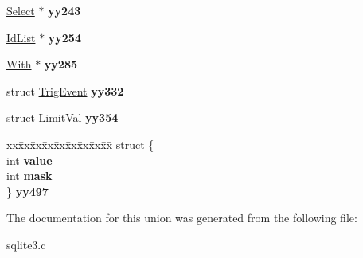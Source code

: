 \begin{DoxyCompactItemize}
\item 
\hyperlink{structSelect}{Select} $\ast$ {\bfseries yy243}\hypertarget{unionYYMINORTYPE_a80ed4018ab77efab9019fb79998c2fac}{}\label{unionYYMINORTYPE_a80ed4018ab77efab9019fb79998c2fac}

\item 
\hyperlink{structIdList}{Id\+List} $\ast$ {\bfseries yy254}\hypertarget{unionYYMINORTYPE_a2c5a8617af8d21140ef030b3432fc88a}{}\label{unionYYMINORTYPE_a2c5a8617af8d21140ef030b3432fc88a}

\item 
\hyperlink{structWith}{With} $\ast$ {\bfseries yy285}\hypertarget{unionYYMINORTYPE_a352681ca0ddf1e1eb6208f2277bbe70f}{}\label{unionYYMINORTYPE_a352681ca0ddf1e1eb6208f2277bbe70f}

\item 
struct \hyperlink{structTrigEvent}{Trig\+Event} {\bfseries yy332}\hypertarget{unionYYMINORTYPE_aed59879c2d3501a15586de9eba852459}{}\label{unionYYMINORTYPE_aed59879c2d3501a15586de9eba852459}

\item 
struct \hyperlink{structLimitVal}{Limit\+Val} {\bfseries yy354}\hypertarget{unionYYMINORTYPE_a8dc6d33ba3ddcb6b3abb56481ec623f3}{}\label{unionYYMINORTYPE_a8dc6d33ba3ddcb6b3abb56481ec623f3}

\item 
\begin{tabbing}
xx\=xx\=xx\=xx\=xx\=xx\=xx\=xx\=xx\=\kill
struct \{\\
\>int {\bfseries value}\\
\>int {\bfseries mask}\\
\} {\bfseries yy497}\hypertarget{unionYYMINORTYPE_a4a258ed78846162da1f87131a866a9bf}{}\label{unionYYMINORTYPE_a4a258ed78846162da1f87131a866a9bf}
\\

\end{tabbing}\end{DoxyCompactItemize}


The documentation for this union was generated from the following file\+:\begin{DoxyCompactItemize}
\item 
sqlite3.\+c\end{DoxyCompactItemize}
